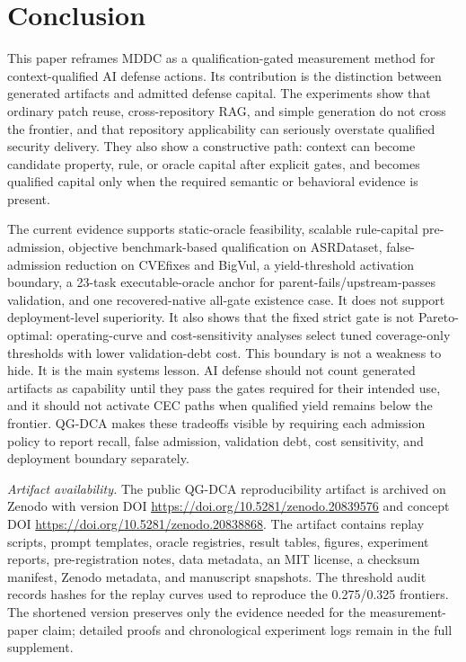 ﻿\documentclass[lettersize,journal]{IEEEtran}
\begin{document}
\section{Conclusion}
This paper reframes MDDC as a qualification-gated measurement method for context-qualified AI defense actions. Its contribution is the distinction between generated artifacts and admitted defense capital. The experiments show that ordinary patch reuse, cross-repository RAG, and simple generation do not cross the frontier, and that repository applicability can seriously overstate qualified security delivery. They also show a constructive path: context can become candidate property, rule, or oracle capital after explicit gates, and becomes qualified capital only when the required semantic or behavioral evidence is present.

The current evidence supports static-oracle feasibility, scalable rule-capital pre-admission, objective benchmark-based qualification on ASRDataset, false-admission reduction on CVEfixes and BigVul, a yield-threshold activation boundary, a 23-task executable-oracle anchor for parent-fails/upstream-passes validation, and one recovered-native all-gate existence case. It does not support deployment-level superiority. It also shows that the fixed strict gate is not Pareto-optimal: operating-curve and cost-sensitivity analyses select tuned coverage-only thresholds with lower validation-debt cost. This boundary is not a weakness to hide. It is the main systems lesson. AI defense should not count generated artifacts as capability until they pass the gates required for their intended use, and it should not activate CEC paths when qualified yield remains below the frontier. QG-DCA makes these tradeoffs visible by requiring each admission policy to report recall, false admission, validation debt, cost sensitivity, and deployment boundary separately.

\textit{Artifact availability.} The public QG-DCA reproducibility artifact is archived on Zenodo with version DOI \url{https://doi.org/10.5281/zenodo.20839576} and concept DOI \url{https://doi.org/10.5281/zenodo.20838868}. The artifact contains replay scripts, prompt templates, oracle registries, result tables, figures, experiment reports, pre-registration notes, data metadata, an MIT license, a checksum manifest, Zenodo metadata, and manuscript snapshots. The threshold audit records hashes for the replay curves used to reproduce the 0.275/0.325 frontiers. The shortened version preserves only the evidence needed for the measurement-paper claim; detailed proofs and chronological experiment logs remain in the full supplement.
\end{document}
